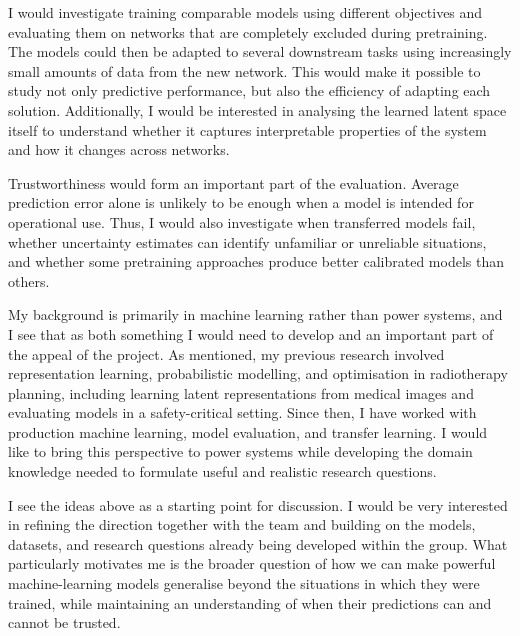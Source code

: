 \documentclass[11pt,a4paper]{moderncv}
\begin{document}
\vspace{4pt}
\hspace*{2em}
I would investigate training comparable models using different objectives and evaluating them on networks that are completely excluded during pretraining. The models could then be adapted to several downstream tasks using increasingly small amounts of data from the new network. This would make it possible to study not only predictive performance, but also the efficiency of adapting each solution. Additionally, I would be interested in analysing the learned latent space itself to understand whether it captures interpretable properties of the system and how it changes across networks.

\vspace{4pt}
\hspace*{2em}
Trustworthiness would form an important part of the evaluation. Average prediction error alone is unlikely to be enough when a model is intended for operational use. Thus, I would also investigate when transferred models fail, whether uncertainty estimates can identify unfamiliar or unreliable situations, and whether some pretraining approaches produce better calibrated models than others.

\vspace{4pt}
\hspace*{2em}
My background is primarily in machine learning rather than power systems, and I see that as both something I would need to develop and an important part of the appeal of the project. As mentioned, my previous research involved representation learning, probabilistic modelling, and optimisation in radiotherapy planning, including learning latent representations from medical images and evaluating models in a safety-critical setting. Since then, I have worked with production machine learning, model evaluation, and transfer learning. I would like to bring this perspective to power systems while developing the domain knowledge needed to formulate useful and realistic research questions.

\vspace{4pt}
\hspace*{2em}
I see the ideas above as a starting point for discussion. I would be very interested in refining the direction together with the team and building on the models, datasets, and research questions already being developed within the group. What particularly motivates me is the broader question of how we can make powerful machine-learning models generalise beyond the situations in which they were trained, while maintaining an understanding of when their predictions can and cannot be trusted.
\end{document}
